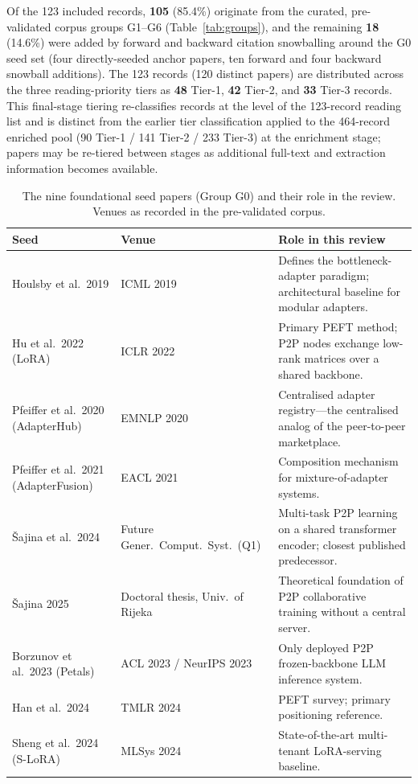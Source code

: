 Of the 123 included records, \textbf{105} (85.4\%) originate from the curated,
pre-validated corpus groups G1--G6 (Table~\ref{tab:groups}), and the remaining
\textbf{18} (14.6\%) were added by forward and backward citation snowballing
around the G0 seed set (four directly-seeded anchor papers, ten forward and four
backward snowball additions). The 123 records (120 distinct papers) are
distributed across the three reading-priority tiers as \textbf{48} Tier-1,
\textbf{42} Tier-2, and \textbf{33} Tier-3 records. This final-stage tiering
re-classifies records at the level of the 123-record reading list and is
distinct from the earlier tier classification applied to the 464-record
enriched pool (90 Tier-1 / 141 Tier-2 / 233 Tier-3) at the enrichment stage;
papers may be re-tiered between stages as additional full-text and extraction
information becomes available.

\begin{table}[H]
\centering
\caption{The nine foundational seed papers (Group G0) and their role in the
review. Venues as recorded in the pre-validated corpus.}
\label{tab:g0_seeds}
\begin{tabular}{lp{}p{}}
\toprule
\textbf{Seed} & \textbf{Venue} & \textbf{Role in this review} \\
\midrule
Houlsby et al.\ 2019 & ICML 2019 & Defines the bottleneck-adapter
paradigm; architectural baseline for modular adapters. \\
Hu et al.\ 2022 (LoRA) & ICLR 2022 & Primary PEFT method; P2P nodes
exchange low-rank matrices over a shared backbone. \\
Pfeiffer et al.\ 2020 (AdapterHub) & EMNLP 2020 & Centralised adapter
registry---the centralised analog of the peer-to-peer marketplace. \\
Pfeiffer et al.\ 2021 (AdapterFusion) & EACL 2021 & Composition mechanism
for mixture-of-adapter systems. \\
{\v{S}}ajina et al.\ 2024 & Future Gener.\ Comput.\ Syst.\ (Q1) &
Multi-task P2P learning on a shared transformer encoder; closest published
predecessor. \\
{\v{S}}ajina 2025 & Doctoral thesis, Univ.\ of Rijeka & Theoretical
foundation of P2P collaborative training without a central server. \\
Borzunov et al.\ 2023 (Petals) & ACL 2023 / NeurIPS 2023 & Only deployed P2P
frozen-backbone LLM inference system. \\
Han et al.\ 2024 & TMLR 2024 & PEFT survey; primary positioning reference. \\
Sheng et al.\ 2024 (S-LoRA) & MLSys 2024 & State-of-the-art multi-tenant
LoRA-serving baseline. \\
\bottomrule
\end{tabular}
\end{table}

